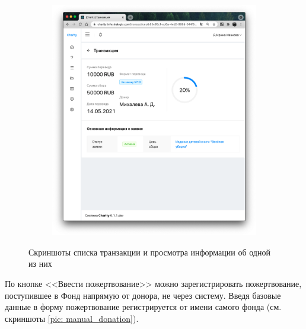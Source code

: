 \documentclass[a4paper,12pt,reqno]{article}
\begin{document}
\begin{figure}[H]
\begin{subfigure}[b]{0.475\linewidth}
			\includegraphics[width=\linewidth]{img/ro/donation.png}
		\end{subfigure}
		\caption{Скриншоты списка транзакции и просмотра информации об одной из них}
		\label{pic: transactions}
	\end{figure}
	
	По кнопке <<Ввести пожертвование>> можно зарегистрировать пожертвование, поступившее в Фонд напрямую от донора, не через систему. Введя базовые данные в форму пожертвование регистрируется от имени самого фонда (см. скриншоты \ref{pic: manual_donation}). 
	
\end{document}
